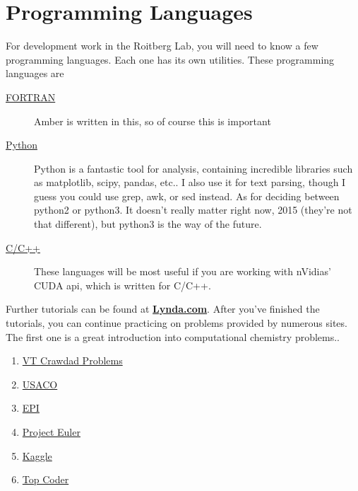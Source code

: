 \documentclass{article}
\begin{document}
\section*{Programming Languages}

For development work in the Roitberg Lab, you will need to know a few programming languages.
Each one has its own utilities. These programming languages are

\begin{description}
  \item[\href{http://www.fortrantutorial.com/}{FORTRAN}] Amber is written in this, so of course this is important
  \item[\href{https://docs.python.org/3/tutorial/}{Python}] Python is a fantastic tool for analysis, containing incredible libraries such as matplotlib, scipy, pandas, etc..
    I also use it for text parsing, though I guess you could use grep, awk, or sed instead.
    As for deciding between python2 or python3. It doesn't really matter right now, 2015 (they're not that different), but python3 is the way of the future.
  \item[\href{http://www.cplusplus.com/doc/tutorial/introduction/}{C/C++}] These languages will be most useful if you are working with nVidias' CUDA api, which is written for C/C++.
\end{description}

Further tutorials can be found at \href{https://training.it.ufl.edu/services/lynda/}{\textbf{Lynda.com}}.
After you've finished the tutorials, you can continue practicing on problems provided by numerous sites.
The first one is a great introduction into computational chemistry problems..

\begin{enumerate}
  \item \href{http://sirius.chem.vt.edu/wiki/doku.php?id=crawdad:programming}{VT Crawdad Problems}
  \item \href{http://train.usaco.org/usacogate}{USACO}
  \item \href{http://www.amazon.com/Elements-Programming-Interviews-Insiders-Guide/dp/1479274836/ref=sr\_1\_3?s=books&ie=UTF8&qid=1446406481&sr=1-3&keywords=cracking+the+coding+interview}{EPI}
  \item \href{https://projecteuler.net/}{Project Euler}
  \item \href{https://www.kaggle.com/}{Kaggle}
  \item \href{https://www.topcoder.com/}{Top Coder}
\end{enumerate}
\end{document}
